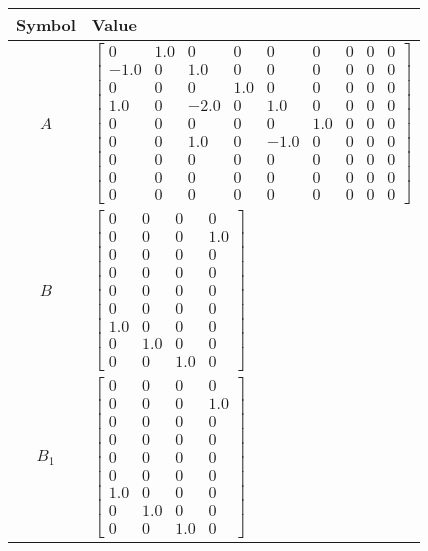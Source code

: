 \begin{tabular}{cl}
\hline
  Symbol  & Value                                                                                                                                                                                                                                                                                                                                                                                     \\
\hline
   $A$    & $\left[\begin{matrix}0 & 1.0 & 0 & 0 & 0 & 0 & 0 & 0 & 0\\-1.0 & 0 & 1.0 & 0 & 0 & 0 & 0 & 0 & 0\\0 & 0 & 0 & 1.0 & 0 & 0 & 0 & 0 & 0\\1.0 & 0 & -2.0 & 0 & 1.0 & 0 & 0 & 0 & 0\\0 & 0 & 0 & 0 & 0 & 1.0 & 0 & 0 & 0\\0 & 0 & 1.0 & 0 & -1.0 & 0 & 0 & 0 & 0\\0 & 0 & 0 & 0 & 0 & 0 & 0 & 0 & 0\\0 & 0 & 0 & 0 & 0 & 0 & 0 & 0 & 0\\0 & 0 & 0 & 0 & 0 & 0 & 0 & 0 & 0\end{matrix}\right]$ \\
   $B$    & $\left[\begin{matrix}0 & 0 & 0 & 0\\0 & 0 & 0 & 1.0\\0 & 0 & 0 & 0\\0 & 0 & 0 & 0\\0 & 0 & 0 & 0\\0 & 0 & 0 & 0\\1.0 & 0 & 0 & 0\\0 & 1.0 & 0 & 0\\0 & 0 & 1.0 & 0\end{matrix}\right]$                                                                                                                                                                                                    \\
 $B_{1}$  & $\left[\begin{matrix}0 & 0 & 0 & 0\\0 & 0 & 0 & 1.0\\0 & 0 & 0 & 0\\0 & 0 & 0 & 0\\0 & 0 & 0 & 0\\0 & 0 & 0 & 0\\1.0 & 0 & 0 & 0\\0 & 1.0 & 0 & 0\\0 & 0 & 1.0 & 0\end{matrix}\right]$                                                                                                                                                                                                    \\

\end{tabular}
